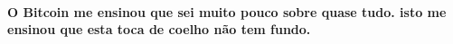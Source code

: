 \paragraph{O Bitcoin me ensinou que sei muito pouco sobre quase tudo. isto
me ensinou que esta toca de coelho não tem fundo.}

%
%
%
%
%
